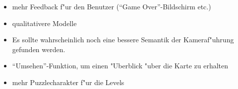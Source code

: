 \begin{itemize}
	\item
		mehr Feedback f"ur den Benutzer (``Game Over''-Bildschirm etc.)
	\item
		qualitativere Modelle
	\item
		Es sollte wahrscheinlich noch eine bessere Semantik
		der Kameraf"uhrung gefunden werden.
	\item
		``Umsehen''-Funktion, um einen "Uberblick "uber die Karte
		zu erhalten
	\item
		mehr Puzzlecharakter f"ur die Levels
\end{itemize}
